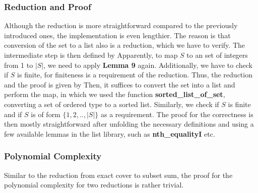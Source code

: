 \subsubsection*{Reduction and Proof}
Although the reduction is more straightforward compared to the previously introduced ones, the implementation is even lengthier. 
The reason is that conversion of the set to a list also is a reduction, which we have to verify. The intermediate step is then
defined by 
Apparently, to map $S$ to an set of integers from 1 to $|S|$, we need to apply \textbf{Lemma 9} again. Additionally, we have to 
check if $S$ is finite, for finiteness is a requirement of the reduction.
Thus, the reduction and the proof 
is given by
Then, it suffices to convert the set into a list and perform the map, in which we used the function 
\textbf{sorted\_list\_of\_set}, converting a set of ordered type to a sorted list. Similarly, we check if 
$S$ is finite and if $S$ is of form $\{1, 2, .. , |S|\}$ as a requirement. The proof for the correctness is then mostly straightforward
after unfolding the necessary definitions and using a few available lemmas in the list library, such as \textbf{nth\_equalityI} etc. 

\subsubsection*{Polynomial Complexity}
Similar to the reduction from exact cover to subset sum, the proof for the polynomial complexity for two reductions 
is rather trivial. 

